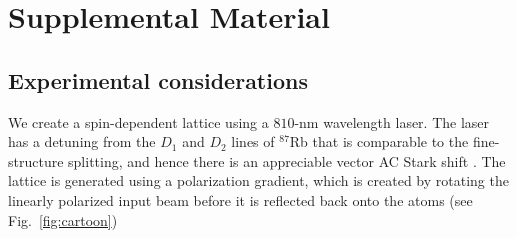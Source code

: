 \newcommand{\comment}[2][]{\todo[color=red!100!green!33, #1]{#2}}
\newcommand{\note}[2][]{\todo[color=myellow, #1]{#2}}
\newcommand{\newmat}[1]{\textcolor{red}{#1}}
\newcommand{\rmtxt}[1]{\st{#1}}


%
%
%
%
%

\section*{Supplemental Material}

\subsection*{Experimental considerations}
We create a spin-dependent lattice using a $810$-nm wavelength laser. The laser has a detuning from the $D_1$ and $D_2$ lines of $^{87}$Rb that is comparable to the fine-structure splitting, and hence there is an appreciable vector AC Stark shift \cite{Grimm00, LeKien13}. The lattice is generated using a polarization gradient, which is created by rotating the linearly polarized input beam before it is reflected back onto the atoms (see Fig.~\ref{fig:cartoon}) 

